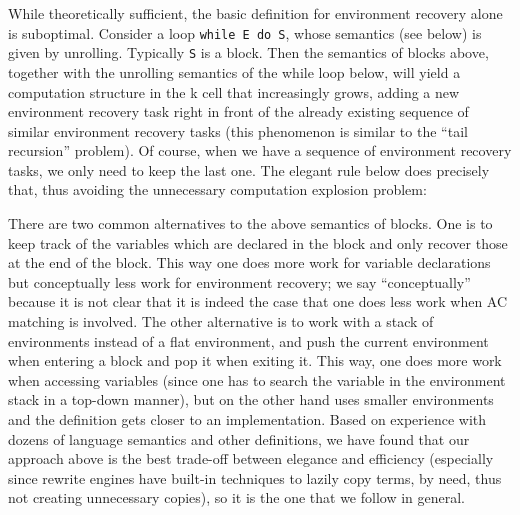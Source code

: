 \documentclass{article}
\begin{document}
\begin{kdefinition}
\begin{module}{}
\begin{syntaxBlock}{}
\end{syntaxBlock}
\begin{kblock}[text]
  While theoretically sufficient, the basic definition for environment
recovery alone is suboptimal.  Consider a loop \texttt{while E do S},
whose semantics (see below) is given by unrolling.  Typically \texttt{S}
is a block.  Then the semantics of blocks above, together with the
unrolling semantics of the while loop below, will yield a computation
structure in the \textsf{k} cell that increasingly grows, adding a new
environment recovery task right in front of the already existing sequence of
similar environment recovery tasks (this phenomenon is similar to the ``tail
recursion'' problem).  Of course, when we have a sequence of environment
recovery tasks, we only need to keep the last one.  The elegant rule below
does precisely that, thus avoiding the unnecessary computation explosion
problem:  \end{kblock}
\begin{kblock}[text]
 There are two common alternatives to the above semantics of blocks.
One is to keep track of the variables which are declared in the block and only
recover those at the end of the block.  This way one does more work for
variable declarations but conceptually less work for environment recovery; we
say ``conceptually'' because it is not clear that it is indeed the case that
one does less work when AC matching is involved.  The other alternative is to
work with a stack of environments instead of a flat environment, and push the
current environment when entering a block and pop it when exiting it.  This
way, one does more work when accessing variables (since one has to search the
variable in the environment stack in a top-down manner), but on the other hand
uses smaller environments and the definition gets closer to an implementation.
Based on experience with dozens of language semantics and other \K definitions,
we have found that our approach above is the best trade-off between elegance
and efficiency (especially since rewrite engines have built-in techniques to
lazily copy terms, by need, thus not creating unnecessary copies),
so it is the one that we follow in general. \end{kblock}
\begin{kblock}[text]

\end{kblock}
\end{module}
\end{kdefinition}
\end{document}
